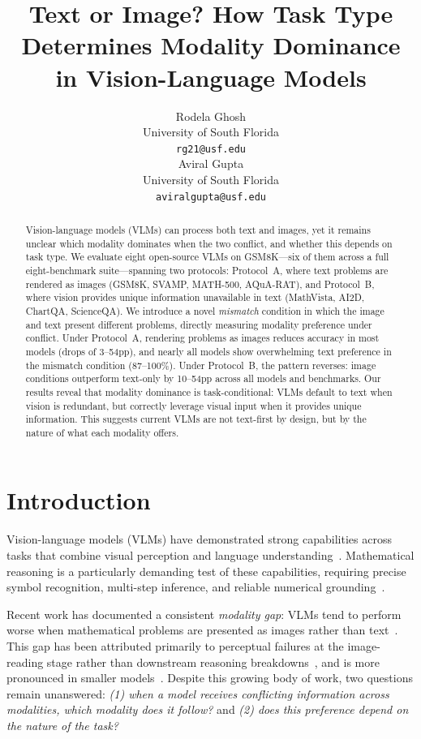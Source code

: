 \documentclass[11pt]{article}
\title{Text or Image? How Task Type Determines Modality Dominance in Vision-Language Models}
\author{
Rodela Ghosh \\
University of South Florida \\
\texttt{rg21@usf.edu} \\
\And
Aviral Gupta \\
University of South Florida \\
\texttt{aviralgupta@usf.edu} \\
}
\begin{document}
\maketitle

\begin{abstract}
Vision-language models (VLMs) can process both text and images, yet it remains unclear which modality dominates when the two conflict, and whether this depends on task type. We evaluate eight open-source VLMs on GSM8K---six of them across a full eight-benchmark suite---spanning two protocols: Protocol~A, where text problems are rendered as images (GSM8K, SVAMP, MATH-500, AQuA-RAT), and Protocol~B, where vision provides unique information unavailable in text (MathVista, AI2D, ChartQA, ScienceQA). We introduce a novel \textit{mismatch} condition in which the image and text present different problems, directly measuring modality preference under conflict. Under Protocol~A, rendering problems as images reduces accuracy in most models (drops of 3--54pp), and nearly all models show overwhelming text preference in the mismatch condition (87--100\%). Under Protocol~B, the pattern reverses: image conditions outperform text-only by 10--54pp across all models and benchmarks. Our results reveal that modality dominance is task-conditional: VLMs default to text when vision is redundant, but correctly leverage visual input when it provides unique information. This suggests current VLMs are not text-first by design, but by the nature of what each modality offers.
\end{abstract}

\section{Introduction}

Vision-language models (VLMs) have demonstrated strong capabilities across tasks that combine visual perception and language understanding~\cite{liu2023llava,bai2023qwen,chen2024internvl2}. Mathematical reasoning is a particularly demanding test of these capabilities, requiring precise symbol recognition, multi-step inference, and reliable numerical grounding~\cite{lu2023mathvista,cobbe2021gsm8k}.

Recent work has documented a consistent \textit{modality gap}: VLMs tend to perform worse when mathematical problems are presented as images rather than text~\cite{zhang2025gsm8kv,wang2026crossmath,chen2026vista}. This gap has been attributed primarily to perceptual failures at the image-reading stage rather than downstream reasoning breakdowns~\cite{liu2026readingnotthinking}, and is more pronounced in smaller models~\cite{zhang2026vistira}. Despite this growing body of work, two questions remain unanswered: \textit{(1) when a model receives conflicting information across modalities, which modality does it follow?} and \textit{(2) does this preference depend on the nature of the task?}
\end{document}
